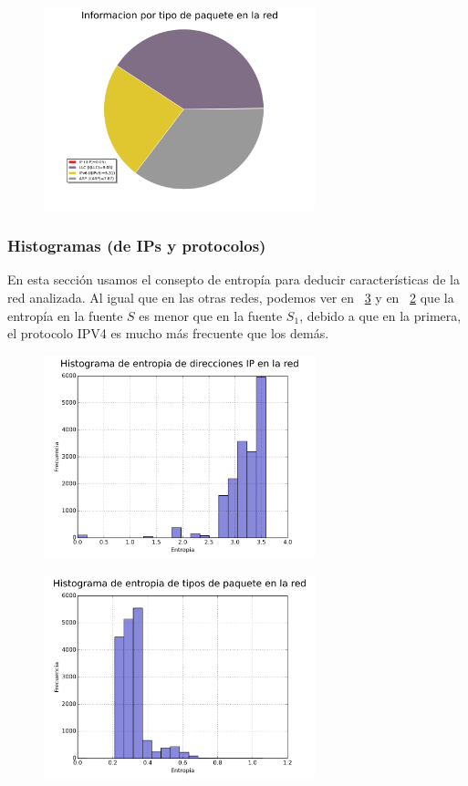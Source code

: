 \begin{figure}[h!]
  \centering
   \includegraphics[width=0.7\textwidth]{graficos/galerias_pacifico3_10min_pie_type_information.png}
  \caption{}
  \label{fig:galerias_pacifico3_10min_pie_type_information}
\end{figure}

\subsubsection{Histogramas (de IPs y protocolos)}
En esta sección usamos el consepto de entropía para deducir características de la red analizada. Al igual que en las otras redes, podemos ver en ~\ref{fig:galerias_pacifico3_10min_hist_type} y en ~\ref{fig:galerias_pacifico3_10min_hist_arp} que la entropía en la fuente $S$ es menor que en la fuente $S_1$, debido a que en la primera, el protocolo IPV4 es mucho más frecuente que los demás.


\begin{figure}[h!]
  \centering
   \includegraphics[width=0.7\textwidth]{graficos/galerias_pacifico3_10min_hist_arp.png}
  \caption{}
  \label{fig:galerias_pacifico3_10min_hist_arp}
\end{figure}

\begin{figure}[h!]
  \centering
   \includegraphics[width=0.7\textwidth]{graficos/galerias_pacifico3_10min_hist_type.png}
  \caption{}
  \label{fig:galerias_pacifico3_10min_hist_type}
\end{figure}





